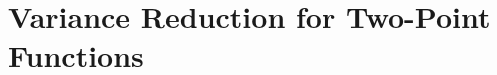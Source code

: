\documentclass[%
    twoside, openright, titlepage, numbers=noenddot,%
    cleardoublepage=empty,%
    abstract=false,
    BCOR=5.5mm, paper=a5, fontsize=10pt,%
]{scrreprt}
\begin{document}
\part{Variance Reduction for Two-Point Functions}

\cleardoublepage%
\def\dir{chapters/part-2/01-introduction}


\cleardoublepage%
\def\dir{chapters/part-2/02-methodology}


\cleardoublepage%
\def\dir{chapters/part-2/03-results}


\cleardoublepage%
\def\dir{chapters/part-2/04-discussion}


\cleardoublepage%
\def\dir{chapters/11-conclusion-outlook}



\appendix
\cleardoublepage%
\def\dir{chapters/99-A-appendix}


\cleardoublepage%
\def\dir{chapters/99-B-appendix}


\cleardoublepage

\cleardoublepage
\cleardoublepage
\end{document}
